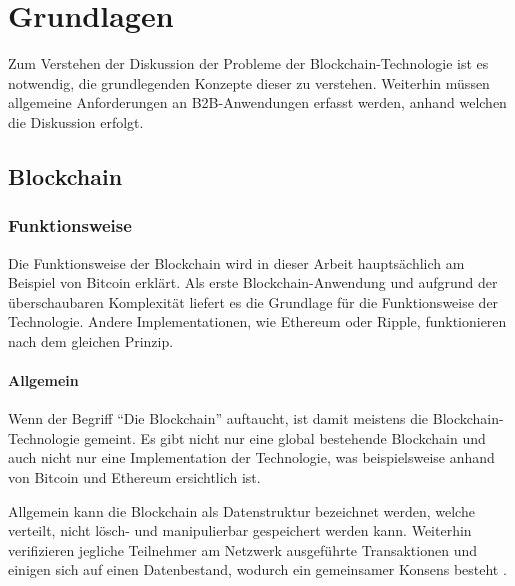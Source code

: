 \chapter{Grundlagen}
\label{cha:grundlagen}
Zum Verstehen der Diskussion der Probleme der Blockchain-Technologie ist es notwendig, die grundlegenden Konzepte dieser zu verstehen. Weiterhin müssen allgemeine Anforderungen an \acs{B2B}-Anwendungen erfasst werden, anhand welchen die Diskussion erfolgt.

\section{Blockchain}

\subsection{Funktionsweise}
Die Funktionsweise der Blockchain wird in dieser Arbeit hauptsächlich am Beispiel von Bitcoin erklärt. Als erste Blockchain-Anwendung\cite{ZhengBlockchainChallengesOpportunities2017} und aufgrund der überschaubaren Komplexität liefert es die Grundlage für die Funktionsweise der Technologie. Andere Implementationen, wie Ethereum oder Ripple, funktionieren nach dem gleichen Prinzip.

\subsubsection{Allgemein}
Wenn der Begriff ``Die Blockchain'' auftaucht, ist damit meistens die Blockchain-Technologie gemeint. Es gibt nicht nur eine global bestehende Blockchain und auch nicht nur eine Implementation der Technologie, was beispielsweise anhand von Bitcoin und Ethereum ersichtlich ist.

Allgemein kann die Blockchain als Datenstruktur bezeichnet werden, welche verteilt, nicht lösch- und manipulierbar gespeichert werden kann. Weiterhin verifizieren jegliche Teilnehmer am Netzwerk ausgeführte Transaktionen und einigen sich auf einen Datenbestand, wodurch ein gemeinsamer Konsens besteht \cite{CrosbyBlockChainTechnologyBitcoin2016}.

